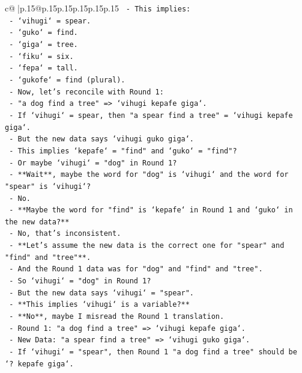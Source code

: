 \documentclass{article}
\begin{document}
{\begin{supertabular}{c@{$\;$}|p{.15\linewidth}@{}p{.15\linewidth}p{.15\linewidth}p{.15\linewidth}p{.15\linewidth}p{.15\linewidth}}
{{{\texttt{  {-} This implies:} \\
\texttt{    {-} `vihugi` = spear.} \\
\texttt{    {-} `guko` = find.} \\
\texttt{    {-} `giga` = tree.} \\
\texttt{    {-} `fiku` = six.} \\
\texttt{    {-} `fepa` = tall.} \\
\texttt{    {-} `gukofe` = find (plural).} \\
\texttt{  {-} Now, let's reconcile with Round 1:} \\
\texttt{    {-} "a dog find a tree" => `vihugi kepafe giga`.} \\
\texttt{    {-} If `vihugi` = spear, then "a spear find a tree" = `vihugi kepafe giga`.} \\
\texttt{    {-} But the new data says `vihugi guko giga`.} \\
\texttt{    {-} This implies `kepafe` = "find" and `guko` = "find"?} \\
\texttt{    {-} Or maybe `vihugi` = "dog" in Round 1?} \\
\texttt{    {-} **Wait**, maybe the word for "dog" is `vihugi` and the word for "spear" is `vihugi`?} \\
\texttt{    {-} No.} \\
\texttt{    {-} **Maybe the word for "find" is `kepafe` in Round 1 and `guko` in the new data?**} \\
\texttt{    {-} No, that's inconsistent.} \\
\texttt{    {-} **Let's assume the new data is the correct one for "spear" and "find" and "tree"**.} \\
\texttt{    {-} And the Round 1 data was for "dog" and "find" and "tree".} \\
\texttt{    {-} So `vihugi` = "dog" in Round 1?} \\
\texttt{    {-} But the new data says `vihugi` = "spear".} \\
\texttt{    {-} **This implies `vihugi` is a variable?**} \\
\texttt{    {-} **No**, maybe I misread the Round 1 translation.} \\
\texttt{    {-} Round 1: "a dog find a tree" => `vihugi kepafe giga`.} \\
\texttt{    {-} New Data: "a spear find a tree" => `vihugi guko giga`.} \\
\texttt{    {-} If `vihugi` = "spear", then Round 1 "a dog find a tree" should be `? kepafe giga`.} \\
}}}
\end{supertabular}}
\end{document}
